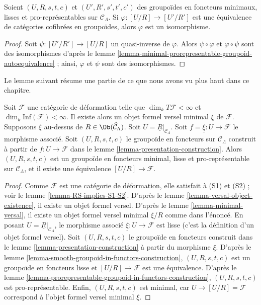 \begin{lemma}
\label{lemma-minimal-prorepresentable-groupoid-equivalence}
Soient $(U, R, s, t, c)$ et $(U', R', s', t', c')$ des groupoïdes en foncteurs
minimaux, lisses et pro-représentables sur $\mathcal{C}_\Lambda$. Si
$\varphi : [U/R] \to [U'/R']$ est une équivalence de catégories cofibrées en
groupoïdes, alors $\varphi$ est un isomorphisme.
\end{lemma}

\begin{proof}
Soit $\psi : [U'/R'] \to [U/R]$ un quasi-inverse de $\varphi$. Alors
$\psi \circ \varphi$ et $\varphi \circ \psi$ sont des isomorphismes d'après
le lemme \ref{lemma-minimal-prorepresentable-groupoid-autoequivalence} ; ainsi,
$\varphi$ et $\psi$ sont des isomorphismes.
\end{proof}

\noindent
Le lemme suivant résume une partie de ce que nous avons vu plus haut dans ce
chapitre.

\begin{lemma}
\label{lemma-minimal-groupoid-in-functors-construction}
Soit $\mathcal{F}$ une catégorie de déformation telle que
$\dim_k T\mathcal{F} <\infty$ et
$\dim_k \text{Inf}(\mathcal{F}) < \infty$. Il existe alors un objet formel
versel minimal $\xi$ de $\mathcal{F}$. Supposons $\xi$ au-dessus de
$R \in \Ob(\widehat{\mathcal{C}}_\Lambda)$. Soit
$U = \underline{R}|_{\mathcal{C}_\Lambda}$. Soit
$f = \underline{\xi} : U \to \mathcal{F}$ le morphisme associé. Soit
$(U, R, s, t, c)$ le groupoïde en foncteurs sur $\mathcal{C}_\Lambda$
construit à partir de $f : U \to \mathcal{F}$ dans le lemme
\ref{lemma-presentation-construction}. Alors $(U, R, s, t, c)$ est un
groupoïde en foncteurs minimal, lisse et pro-représentable sur
$\mathcal{C}_\Lambda$, et il existe une équivalence
$[U/R] \to \mathcal{F}$.
\end{lemma}

\begin{proof}
Comme $\mathcal{F}$ est une catégorie de déformation, elle satisfait à (S1)
et (S2) ; voir le lemme \ref{lemma-RS-implies-S1-S2}. D'après le lemme
\ref{lemma-versal-object-existence}, il existe un objet formel versel. D'après
le lemme \ref{lemma-minimal-versal}, il existe un objet formel versel minimal
$\xi/R$ comme dans l'énoncé. En posant
$U = \underline{R}|_{\mathcal{C}_\Lambda}$, le morphisme associé
$\underline{\xi} : U \to \mathcal{F}$ est lisse (c'est la définition d'un
objet formel versel). Soit $(U, R, s, t, c)$ le groupoïde en foncteurs construit
dans le lemme \ref{lemma-presentation-construction} à partir du morphisme
$\underline{\xi}$. D'après le lemme
\ref{lemma-smooth-groupoid-in-functors-construction},
$(U, R, s, t, c)$ est un groupoïde en foncteurs lisse et
$[U/R] \to \mathcal{F}$ est une équivalence. D'après le lemme
\ref{lemma-prorepresentable-groupoid-in-functors-construction},
$(U, R, s, t, c)$ est pro-représentable. Enfin, $(U, R, s, t, c)$ est minimal,
car $U \to [U/R] = \mathcal{F}$ correspond à l'objet formel versel minimal
$\xi$.
\end{proof}


